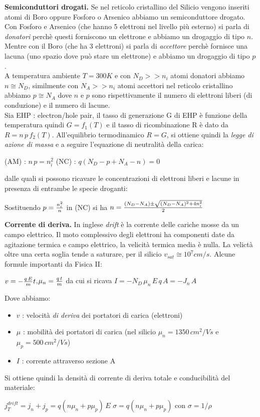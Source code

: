 \documentclass[a4paper,portrait,12pt]{article}
\theoremstyle{definition}
\begin{document}
\textbf{Semiconduttori drogati.} Se nel reticolo cristallino del Silicio vengono inseriti atomi di Boro 
oppure Fosforo o Arsenico abbiamo un semiconduttore drogato. Con Fosforo e Arsenico (che hanno 5 elettroni 
nel livello più esterno) si parla di
\textit{donatori} perchè questi forniscono un elettrone
e abbiamo un drogaggio di tipo $n$. Mentre con il Boro (che ha 3 elettroni) si parla di \textit{accettore} 
perchè fornisce una lacuna (uno spazio dove può stare un elettrone) e abbiamo un drogaggio di tipo $p$.\\

A temperatura ambiente $T = 300K$ e con $N_D >> n_i$ atomi donatori abbiamo $n \cong N_D$, similmente con 
$N_A >> n_i$ atomi accettori nel reticolo cristallino abbiamo $p \cong N_A$ dove $n$ e $p$ sono 
rispettivamente il numero di elettroni liberi (di conduzione) e il numero di lacune.\\

Sia EHP : electron/hole pair, il tasso di generazione G di EHP è funzione della temperatura quindi
$G = f_1(T)$ e il tasso di ricombinazione R è dato da
$R = n\,p\,f_2(T)$. All'equilibrio termodinamico $R = G$, si ottiene quindi la \textit{legge di azione di 
massa} e a seguire l'equazione di neutralità della carica:
\begin{center}
(AM) : $n\,p = n_i^2$ \quad (NC) : $q(N_D - p + N_A - n) = 0$
\end{center}
dalle quali si possono ricavare le concentrazioni di elettroni liberi e lacune in presenza di entrambe le 
specie droganti:
\begin{center}
Sostituendo $p = {n_i^2 \over n}$ in (NC) si ha $n = {(N_D - N_A) \pm \sqrt{(N_D - N_A)^2 + 4n_i^2} \over 
2}$
\end{center} 

\textbf{Corrente di deriva.} In inglese \textit{drift} è la corrente delle cariche mosse da un campo 
elettrico. Il moto complessivo degli elettroni ha componenti date da agitazione 
termica e campo elettrico, la velicità termica media è nulla. La velictà oltre una certa soglia tende a 
saturare, per il silicio $v_{sat} \cong 10^7 cm/s$. Alcune formule importanti da Fisica II:
\begin{center}
$v = -{q\,E \over m}t$,\quad$\mu_n = {q\,t \over m}$ da cui si ricava $I = -N_D\,\mu_n\,E\,q\,A = -J_n\,A$ 
\end{center}
Dove abbiamo:
\begin{itemize}
\item $v$ : velocità \textit{di deriva} dei portatori di carica (elettroni)
\item $\mu$ : mobilità dei portatori di carica (nel silicio
$\mu_n = 1350\,cm^2/Vs$ e $\mu_p = 500\,cm^2/Vs$) 
\item $I$ : corrente attraverso sezione A
\end{itemize}
Si ottiene quindi la densità di corrente di deriva totale e conducibilità del materiale:
\begin{center}
$j_T^{drift} = j_n + j_p = q(n\mu_n + p\mu_p)\,E$ \quad $\sigma = q(n\mu_n + p\mu_p)$ con $\sigma = 1/\rho$
\end{center}
\end{document}
